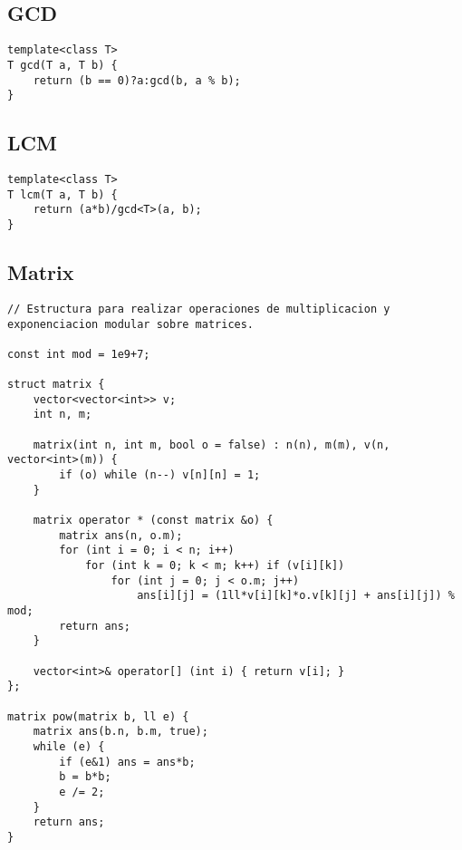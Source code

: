 \documentclass[10pt,letterpaper,twocolumn,twosided]{article}
\begin{document}
\subsection{GCD}
\begin{lstlisting}
template<class T>
T gcd(T a, T b) {
    return (b == 0)?a:gcd(b, a % b);
}
\end{lstlisting}

\subsection{LCM}
\begin{lstlisting}
template<class T>
T lcm(T a, T b) {  
    return (a*b)/gcd<T>(a, b);  
}
\end{lstlisting}

\subsection{Matrix}
\begin{lstlisting}
// Estructura para realizar operaciones de multiplicacion y exponenciacion modular sobre matrices.

const int mod = 1e9+7;

struct matrix {
    vector<vector<int>> v;
    int n, m;
    
    matrix(int n, int m, bool o = false) : n(n), m(m), v(n, vector<int>(m)) {
        if (o) while (n--) v[n][n] = 1;
    }

    matrix operator * (const matrix &o) {
        matrix ans(n, o.m);
        for (int i = 0; i < n; i++)
            for (int k = 0; k < m; k++) if (v[i][k])
                for (int j = 0; j < o.m; j++)
                    ans[i][j] = (1ll*v[i][k]*o.v[k][j] + ans[i][j]) % mod;
        return ans;
    }
    
    vector<int>& operator[] (int i) { return v[i]; }
};

matrix pow(matrix b, ll e) {
    matrix ans(b.n, b.m, true);
    while (e) {
        if (e&1) ans = ans*b;
        b = b*b;
        e /= 2;
    }
    return ans;
}
\end{lstlisting}
\end{document}

